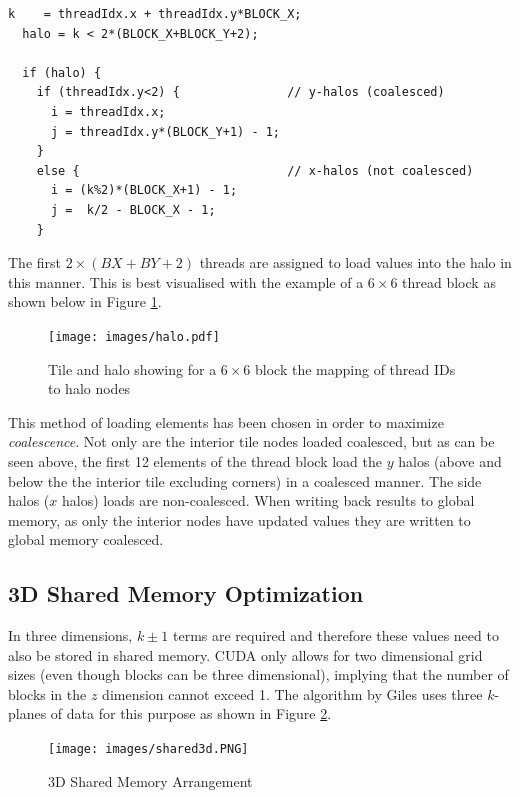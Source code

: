 \begin{spacing}{1.1}
\begin{verbatim}
k    = threadIdx.x + threadIdx.y*BLOCK_X;
  halo = k < 2*(BLOCK_X+BLOCK_Y+2);
  
  if (halo) {
    if (threadIdx.y<2) {               // y-halos (coalesced)
      i = threadIdx.x;
      j = threadIdx.y*(BLOCK_Y+1) - 1;
    }
    else {                             // x-halos (not coalesced)
      i = (k%2)*(BLOCK_X+1) - 1;
      j =  k/2 - BLOCK_X - 1;
    }
\end{verbatim}
\end{spacing}

The first $2 \times (BX + BY +2)$ threads are assigned to load values into the halo in this manner. This is best visualised with the example of a $6 \times 6$ thread block as shown below in Figure \ref{fig:haloloading}.

\begin{figure}[h]
	\centering
		\texttt{[image: images/halo.pdf]}
	\caption{Tile and halo showing for a $6 \times 6$ block the mapping of thread IDs to halo nodes}
	\label{fig:haloloading}
\end{figure}


This method of loading elements has been chosen in order to maximize \textit{coalescence}. Not only are the interior tile nodes loaded coalesced, but as can be seen above, the first 12 elements of the thread block load the $y$ halos (above and below the the interior tile excluding corners) in a coalesced manner. The side halos ($x$ halos) loads are non-coalesced. When writing back results to global memory, as only the interior nodes have updated values they are written to global memory coalesced.

\subsection{3D Shared Memory Optimization}
In three dimensions, $k\pm1$ terms are required and therefore these values need to also be stored in shared memory. CUDA only allows for two dimensional grid sizes (even though blocks can be three dimensional), implying that the number of blocks in the $z$ dimension cannot exceed 1. The algorithm by Giles \cite{mgiles} uses three $k$-planes of data for this purpose as shown in Figure \ref{fig:shared3d}.\\
 
\begin{figure}[h]
	\centering
		\texttt{[image: images/shared3d.PNG]}
	\caption{3D Shared Memory Arrangement}
	\label{fig:shared3d}
\end{figure}


